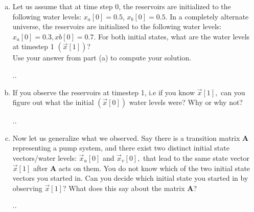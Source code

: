 \documentclass[11pt]{article}
\def\A{\textbf{A}} %
\begin{document}
\begin{enumerate}
\begin{enumerate}[(a)]
	      	\item Let us assume that at time step 0, the reservoirs are initialized to the following water levels: $x_a[0] = 0.5$, $x_b[0] = 0.5$. In a completely alternate universe, the reservoirs are initialized to the following water levels: $x_a[0] = 0.3, xb[0] = 0.7$. For both initial states, what are the water levels at timestep 1 $(\vec x[1])$?\\Use your answer from part (a) to compute your solution.
	      	      \begin{Answer}
	      	      	..
	      	      \end{Answer}
	      	                  
	      	      \newpage
	      	                  
	      	\item If you observe the reservoirs at timestep 1, i.e if you know $\vec x[1],$ can you figure out what the initial $(\vec x[0])$ water levels were? Why or why not?
	      	      \begin{Answer}
	      	      	..
	      	      \end{Answer}
	      	                  
	      	      \newpage
	      	                  
	      	\item Now let us generalize what we observed. Say there is a transition matrix $\A$ representing a pump system, and there exist two distinct initial state vectors/water levels: $\vec x_u[0]$ and $\vec x_v[0],$ that lead to the same state vector $\vec x[1]$ after $\A$ acts on them. You do not know which of the two initial state vectors you started in. Can you decide which initial state you started in by observing $\vec x[1]$? What does this say about the matrix $\A$?
	      	      \begin{Answer}
	      	      	..
	      	      \end{Answer}
	      	                  
	      	      \newpage
	      	                  

\end{enumerate}
\end{enumerate}
\end{document}
